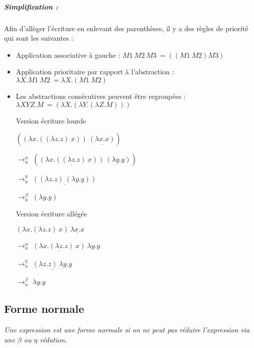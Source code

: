 \documentclass[10pt,a4paper]{report}
\begin{document}
\subparagraph{Simplification :} Afin d'allèger l'écriture en enlevant des parenthèses, il y a des règles de priorité qui sont les suivantes :
\begin{itemize}
\item Application associative à gauche : $M1~M2~M3~= ((M1~M2)M3)$
\item Application prioritaire par rapport à l'abstraction : $\lambda X.M1~M2~= \lambda X.(M1~M2)$
\item Les abstractions consécutives peuvent être regroupées : $\lambda XYZ.M~= (\lambda X.(\lambda Y.(\lambda Z.M)))$
\end{itemize}
\medbreak

\begin{multicols}{2}{
    \begin{itemize}
    \item[] Version écriture lourde
    \item[] $((\lambda x.((\lambda z.z)~x))~\underline{(\lambda x.x)})$
    \item[$\rightarrow_{n}^{\alpha}$] $(\underline{(\lambda x.((\lambda z.z)~x))}~(\lambda y.y))$
    \item[$\rightarrow_{n}^{\eta}$] $\underline{((\lambda z.z)~(\lambda y.y))}$
    \item[$\rightarrow_{n}^{\beta}$] $(\lambda y.y)$
    \end{itemize}
    
    \begin{itemize}
    \item[] Version écriture allégée
    \item[] $(\lambda x.(\lambda z.z)~x)~\underline{\lambda x.x}$
    \item[$\rightarrow_{n}^{\alpha}$] $\underline{(\lambda x.(\lambda z.z)~x)}~\lambda y.y$
    \item[$\rightarrow_{n}^{\eta}$] $\underline{(\lambda z.z)~\lambda y.y}$
    \item[$\rightarrow_{n}^{\beta}$] $\lambda y.y$
    \end{itemize}
  }
\end{multicols}
\bigbreak


\subsection{Forme normale}

\textit{Une expression est une forme normale si on ne peut pas réduire l'expression via une $\beta$ ou $\eta$ rédution.}
\medbreak
\end{document}
